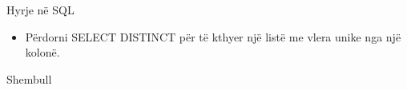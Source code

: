 \documentclass[
  ignorenonframetext,
]{beamer}
\newenvironment{Shaded}{\begin{snugshade}}{\end{snugshade}}
\newcommand{\KeywordTok}[1]{\textcolor[rgb]{0.13,0.29,0.53}{\textbf{#1}}}
\newcommand{\NormalTok}[1]{#1}
\providecommand{\tightlist}{%
  \setlength{\itemsep}{0pt}\setlength{\parskip}{0pt}}
\begin{document}
\begin{frame}{Hyrje në SQL}
\label{hyrje-nuxeb-sql-5}
\begin{itemize}
\tightlist
\item
  Përdorni SELECT DISTINCT për të kthyer një listë me vlera unike nga
  një kolonë.
\end{itemize}
\end{frame}

\begin{frame}[fragile]{Shembull}
\label{shembull-4}
\begin{Shaded}
\end{Shaded}
\end{frame}
\end{document}
